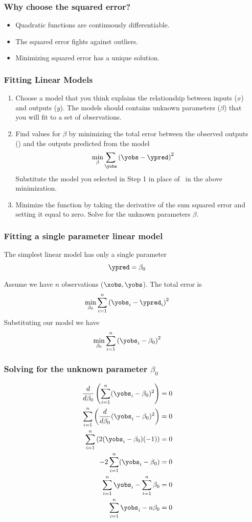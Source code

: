 \documentclass{beamer}
\begin{document}
\begin{frame}
\frametitle{Why choose the squared error?}
\begin{itemize}
	\item Quadratic functions are continuously differentiable.
	\item The squared error fights against outliers.
	\item Minimizing squared error has a unique solution.
\end{itemize}
\end{frame}

\begin{frame}
\frametitle{Fitting Linear Models}
\begin{enumerate}
	\item Choose a model that you think explains the relationship between inputs ($x$) and outputs ($y$). The models should contains unknown parameters ($\beta$) that you will fit to a set of observations.
	\item Find values for $\beta$ by minimizing the total error between the observed outputs (\yobs) and the outputs predicted from the model
	\[ \min_{\beta} \sum_{\yobs}\left(\yobs - \ypred\right)^2 \]
Substitute the model you selected in Step 1 in place of \ypred\ in the above minimization.
	\item Minimize the function by taking the derivative of the sum squared error and setting it equal to zero. Solve for the unknown parameters $\beta$.
\end{enumerate}	
\end{frame}

\begin{frame}
\frametitle{Fitting a single parameter linear model}
The simplest linear model has only a single parameter
\[ \ypred = \beta_0 \]

\pause
Assume we have $n$ observations ($\xobs,\yobs$). The total error is
\[ \min_{\beta_0} \sum_{i=1}^n \left(\yobs_i - \ypred_i\right)^2 \]
\pause
Substituting our model we have
\[ \min_{\beta_0} \sum_{i=1}^n \left(\yobs_i - \beta_0\right)^2 \]
\end{frame}

\begin{frame}
\frametitle{Solving for the unknown parameter $\beta_0$}
\begin{align*}
	\frac{d}{d\beta_0}\left(\sum_{i=1}^n(\yobs_i-\beta_0)^2\right) & = 0 \\
	\sum_{i=1}^n \left(\frac{d}{d\beta_0}(\yobs_i-\beta_0)^2\right) & = 0 \\
	\sum_{i=1}^n \left( 2(\yobs_i-\beta_0)(-1) \right) & = 0 \\
	-2\sum_{i=1}^n(\yobs_i-\beta_0) & = 0 \\
	\sum_{i=1}^n\yobs_i - \sum_{i=1}^n\beta_0 &= 0 \\
	\sum_{i=1}^n\yobs_i - n\beta_0 &= 0 \\
\end{align*}	
\end{frame}
\end{document}
